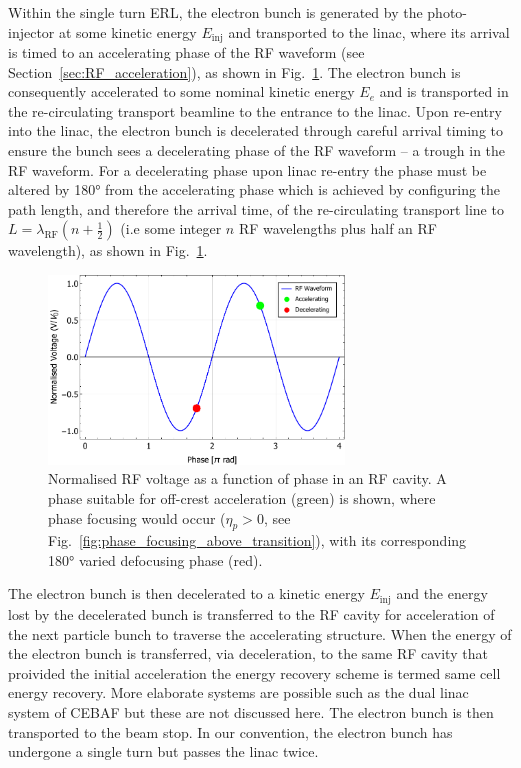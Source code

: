 \documentclass[../main.tex]{subfiles}
\begin{document}
Within the single turn ERL, the electron bunch is generated by the photo-injector at some kinetic energy $E_{\mathrm{inj}}$ and transported to the linac, where its arrival is timed to an accelerating phase of the RF waveform (see Section~\ref{sec:RF_acceleration}), as shown in Fig.~\ref{eq:ERL_RF_acceleration_phase}. The electron bunch is consequently accelerated to some nominal kinetic energy $E_{e}$ and is transported in the re-circulating transport beamline to the entrance to the linac. Upon re-entry into the linac, the electron bunch is decelerated through careful arrival timing to ensure the bunch sees a decelerating phase of the RF waveform -- a trough in the RF waveform. For a decelerating phase upon linac re-entry the phase must be altered by 180\si{\degree} from the accelerating phase which is achieved by configuring the path length, and therefore the arrival time, of the re-circulating transport line to $L= \lambda_{\mathrm{RF}}\left(n+\frac{1}{2}\right)$ (i.e some integer $n$ RF wavelengths plus half an RF wavelength), as shown in Fig.~\ref{eq:ERL_RF_acceleration_phase}. 
\begin{figure}[!h]
\centering
\includegraphics[width=0.7\textwidth]{Figures/Energy_Recovery_Linac_Design/ERL_acc_deacc_RF_phase.pdf}
\caption{Normalised RF voltage as a function of phase in an RF cavity. A phase suitable for off-crest acceleration (green) is shown, where phase focusing would occur ($\eta_{p}>0$, see Fig.~\ref{fig:phase_focusing_above_transition}), with its corresponding 180\si{\degree} varied defocusing phase (red).}
\label{eq:ERL_RF_acceleration_phase}
\end{figure}
The electron bunch is then decelerated to a kinetic energy $E_{\mathrm{inj}}$ and the energy lost by the decelerated bunch is transferred to the RF cavity for acceleration of the next particle bunch to traverse the accelerating structure. When the energy of the electron bunch is transferred, via deceleration, to the same RF cavity that proivided the initial acceleration the energy recovery scheme is termed same cell energy recovery. More elaborate systems are possible such as the dual linac system of CEBAF \cite{bogacz2003cebaf} but these are not discussed here. The electron bunch is then transported to the beam stop. In our convention, the electron bunch has undergone a single turn but passes the linac twice.
\end{document}
